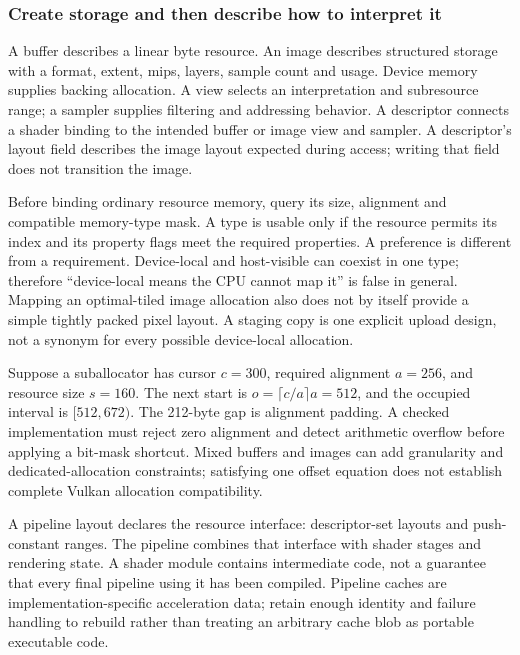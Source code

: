\subsubsection{Create storage and then describe how to interpret it}\label{05-engine-i-ch019-create-storage-and-then-describe-how-to-interpret-it}

\hypertarget{05-engine-i-ch019-create-storage-and-then-describe-how-to-interpret-it}{}

A buffer describes a linear byte resource. An image describes structured storage with a format, extent, mips, layers, sample count and usage. Device memory supplies backing allocation. A view selects an interpretation and subresource range; a sampler supplies filtering and addressing behavior. A descriptor connects a shader binding to the intended buffer or image view and sampler. A descriptor's layout field describes the image layout expected during access; writing that field does not transition the image.

Before binding ordinary resource memory, query its size, alignment and compatible memory-type mask. A type is usable only if the resource permits its index and its property flags meet the required properties. A preference is different from a requirement. Device-local and host-visible can coexist in one type; therefore ``device-local means the CPU cannot map it'' is false in general. Mapping an optimal-tiled image allocation also does not by itself provide a simple tightly packed pixel layout. A staging copy is one explicit upload design, not a synonym for every possible device-local allocation.

Suppose a suballocator has cursor \(c=300\), required alignment \(a=256\), and resource size \(s=160\). The next start is \(o=\lceil c/a\rceil a=512\), and the occupied interval is \([512,672)\). The 212-byte gap is alignment padding. A checked implementation must reject zero alignment and detect arithmetic overflow before applying a bit-mask shortcut. Mixed buffers and images can add granularity and dedicated-allocation constraints; satisfying one offset equation does not establish complete Vulkan allocation compatibility.

A pipeline layout declares the resource interface: descriptor-set layouts and push-constant ranges. The pipeline combines that interface with shader stages and rendering state. A shader module contains intermediate code, not a guarantee that every final pipeline using it has been compiled. Pipeline caches are implementation-specific acceleration data; retain enough identity and failure handling to rebuild rather than treating an arbitrary cache blob as portable executable code.

